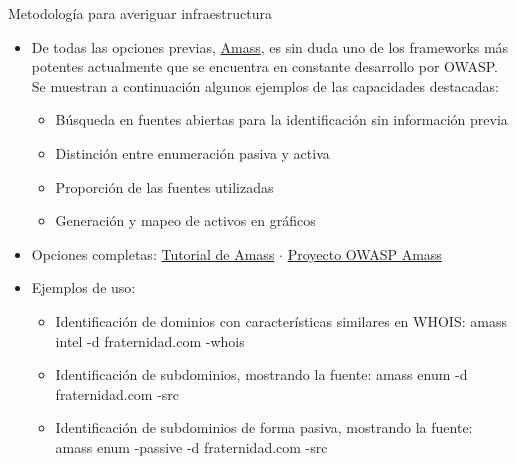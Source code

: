 \documentclass[aspectratio=169,11pt]{beamer}
\begin{document}
\begin{frame}[allowframebreaks]{Metodología para averiguar infraestructura}
\small
  \begin{itemize}
  \item De todas las opciones previas, \href{https://github.com/owasp-amass/amass}{Amass}, es sin duda uno de los frameworks más potentes actualmente que se encuentra en constante desarrollo por OWASP. Se muestran a continuación algunos ejemplos de las capacidades destacadas:
  \begin{itemize}

  \item Búsqueda en fuentes abiertas para la identificación sin información previa
  \item Distinción entre enumeración pasiva y activa
  \item Proporción de las fuentes utilizadas
  \item Generación y mapeo de activos en gráficos
    \end{itemize}
  
  \item Opciones completas: \href{https://github.com/owasp-amass/amass/blob/master/doc/tutorial.md}{Tutorial de Amass} $\cdot$ \href{https://owasp.org/www-project-amass/}{Proyecto OWASP Amass}
  \item Ejemplos de uso:
    \begin{itemize}

    \item Identificación de dominios con características similares en WHOIS: amass intel -d fraternidad.com -whois
  \item Identificación de subdominios, mostrando la fuente: amass enum -d fraternidad.com -src
  \item Identificación de subdominios de forma pasiva, mostrando la fuente: amass enum -passive -d fraternidad.com -src
  \end{itemize}
  \end{itemize}

\end{frame}
\end{document}
